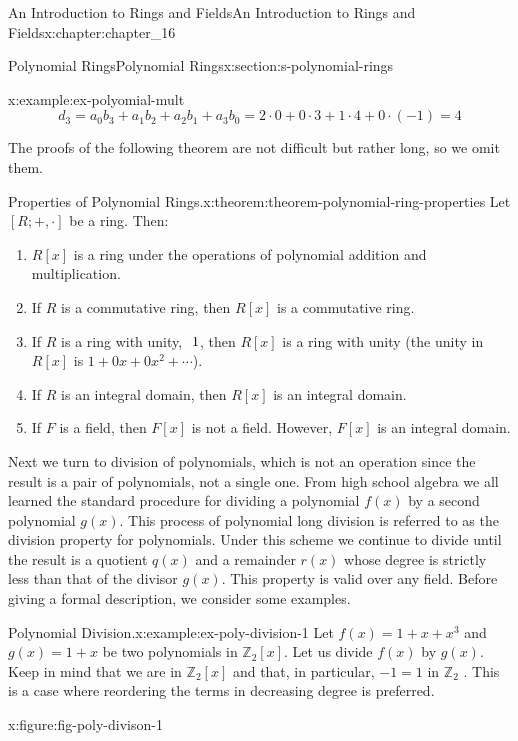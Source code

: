 \documentclass[oneside,10pt,]{book}
\numberwithin{equation}{section}
\begin{document}
\begin{chapterptx}{An Introduction to Rings and Fields}{}{An Introduction to Rings and Fields}{}{}{x:chapter:chapter_16}
\begin{sectionptx}{Polynomial Rings}{}{Polynomial Rings}{}{}{x:section:s-polynomial-rings}
\begin{example}{}{x:example:ex-polyomial-mult}
\begin{equation*}
d_3=a_0 b_3+a_1 b_2+a_2 b_1+a_3b_0 =2\cdot 0+0\cdot 3+1\cdot 4+0\cdot (-1)=4
\end{equation*}
%
\end{example}
The proofs of the following theorem are not difficult but rather long, so we omit them.%
\begin{theorem}{Properties of Polynomial Rings.}{}{x:theorem:theorem-polynomial-ring-properties}%
Let \([R; +, \cdot]\) be a ring. Then:%
\begin{enumerate}[label=(\arabic*)]
\item{}\(R[x]\) is a ring under the operations of polynomial addition and multiplication.%
\item{}If \(R\) is a commutative ring, then \(R[x]\) is a commutative ring.%
\item{}If \(R\) is a ring with unity, \(\textup{ 1}\), then \(R[x]\) is a ring with unity (the unity in \(R[x]\) is \(1 + 0x + 0 x^2 + \cdots\)).%
\item{}If \(R\) is an integral domain, then \(R[x]\) is an integral domain.%
\item{}If \(F\) is a field, then \(F[x]\) is not a field. However, \(F[x]\) is an integral domain.%
\end{enumerate}
%
\end{theorem}
Next we turn to division of polynomials, which is not an operation since the result is a pair of polynomials, not a single one. From high school algebra we all learned the standard procedure for dividing a polynomial \(f(x)\) by a second polynomial \(g(x)\). This process of polynomial long division is referred to as the division property for polynomials. Under this scheme we continue to divide until the result is a quotient \(q(x)\) and a remainder \(r(x)\) whose degree is strictly less than that of the divisor \(g(x)\). This property is valid over any field. Before giving a formal description, we consider some examples.%
\begin{example}{Polynomial Division.}{x:example:ex-poly-division-1}%
Let \(f(x) = 1 + x + x^3\) and \(g(x) = 1 + x\) be two polynomials in  \(\mathbb{Z}_2[x]\). Let us divide \(f(x)\) by \(g(x)\). Keep in mind that we are in \(\mathbb{Z}_2[x]\) and that, in particular, \(-1=1\) in \(\mathbb{Z}_2\) .  This is a case where reordering the terms in decreasing degree is preferred.%
\begin{figureptx}{}{x:figure:fig-poly-divison-1}{}%
\begin{image}{0.275}{0.45}{0.275}%

\end{image}
\end{figureptx}
\end{example}
\end{sectionptx}
\end{chapterptx}
\end{document}
